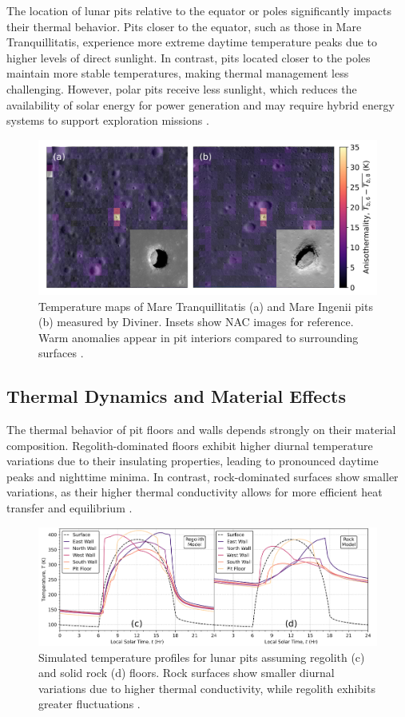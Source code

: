 The location of lunar pits relative to the equator or poles significantly impacts their thermal behavior. Pits closer to the equator, such as those in Mare Tranquillitatis, experience more extreme daytime temperature peaks due to higher levels of direct sunlight. In contrast, pits located closer to the poles maintain more stable temperatures, making thermal management less challenging. However, polar pits receive less sunlight, which reduces the availability of solar energy for power generation and may require hybrid energy systems to support exploration missions \cite{thermal-lunar-pits, newer-thermal}.

\begin{figure}[H]
    \centering
    \includegraphics[width=0.7\linewidth]{lunar-pits-temperature-LROC.png}
    \caption{Temperature maps of Mare Tranquillitatis (a) and Mare Ingenii pits (b) measured by Diviner. Insets show NAC images for reference. Warm anomalies appear in pit interiors compared to surrounding surfaces \cite{thermal-lunar-pits}.}
    \label{fig:lunar-pits-temperatures-LROC}
\end{figure}

\subsection{Thermal Dynamics and Material Effects}

The thermal behavior of pit floors and walls depends strongly on their material composition. Regolith-dominated floors exhibit higher diurnal temperature variations due to their insulating properties, leading to pronounced daytime peaks and nighttime minima. In contrast, rock-dominated surfaces show smaller variations, as their higher thermal conductivity allows for more efficient heat transfer and equilibrium \cite{thermal-lunar-pits, newer-thermal}.

\begin{figure}[H]
    \centering
    \includegraphics[width=0.9\linewidth]{lunar-pit-regolith-vs-stone-thermal.png}
    \caption{Simulated temperature profiles for lunar pits assuming regolith (c) and solid rock (d) floors. Rock surfaces show smaller diurnal variations due to higher thermal conductivity, while regolith exhibits greater fluctuations \cite{thermal-lunar-pits}.}
    \label{fig:regolith-vs-stone-thermal}
\end{figure}

